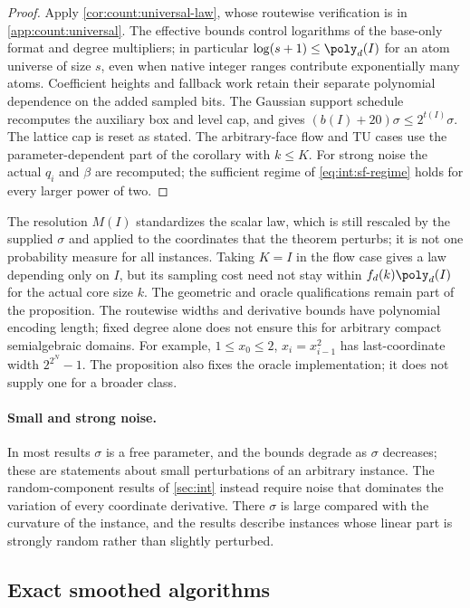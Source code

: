 \begin{proof}
Apply \cref{cor:count:universal-law}, whose routewise verification is in
\cref{app:count:universal}. The effective bounds control logarithms of the
base-only format and degree multipliers; in particular
$\log(s+1)\le\poly_d(I)$ for an atom universe of size $s$, even when native
integer ranges contribute exponentially many atoms. Coefficient heights and
fallback work retain their separate polynomial dependence on the added
sampled bits. The Gaussian support schedule recomputes the auxiliary box and
level cap, and gives $(b(I)+20)\sigma\le2^{t(I)}\sigma$.
The lattice cap is reset as stated. The arbitrary-face flow and TU cases use
the parameter-dependent part of the corollary with $k\le K$.
For strong noise the actual $q_i$ and $\beta$ are recomputed; the sufficient
regime of \cref{eq:int:sf-regime} holds for every larger power of two.
\end{proof}

The resolution $M(I)$ standardizes the scalar law, which is still rescaled
by the supplied $\sigma$ and applied to the coordinates that the theorem
perturbs; it is not one probability measure for all instances. Taking
$K=I$ in the flow case gives a law depending only on $I$, but its sampling
cost need not stay within $f_d(k)\poly_d(I)$ for the actual core size $k$.
The geometric and oracle qualifications remain part of the proposition.
The routewise widths and derivative bounds have polynomial encoding length;
fixed degree alone does not ensure this for arbitrary compact semialgebraic
domains. For example, $1\le x_0\le2$, $x_i=x_{i-1}^2$ has last-coordinate
width $2^{2^N}-1$. The proposition also fixes the oracle implementation; it
does not supply one for a broader class.

\paragraph{Small and strong noise.}
In most results $\sigma$ is a free parameter, and the bounds degrade as
$\sigma$ decreases; these are statements about small perturbations of an
arbitrary instance. The random-component results of \cref{sec:int} instead
require noise that dominates the variation of every coordinate derivative.
There $\sigma$ is large compared with the curvature of the instance, and the
results describe instances whose linear part is strongly random rather than
slightly perturbed.

\subsection{Exact smoothed algorithms}\label{sec:model:algorithms}

